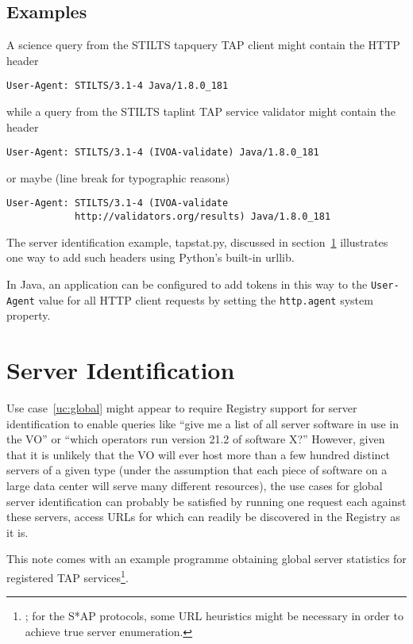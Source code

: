 \documentclass[11pt,a4paper]{ivoa}
\newcommand{\headername}[1]{{\tt #1}}
\begin{document}
\subsection{Examples}

A science query from the STILTS tapquery TAP client might contain the
HTTP header
\begin{verbatim}
User-Agent: STILTS/3.1-4 Java/1.8.0_181
\end{verbatim}
while a query from the STILTS taplint TAP service validator might
contain the header
\begin{verbatim}
User-Agent: STILTS/3.1-4 (IVOA-validate) Java/1.8.0_181
\end{verbatim}
or maybe (line break for typographic reasons)
\begin{verbatim}
User-Agent: STILTS/3.1-4 (IVOA-validate
            http://validators.org/results) Java/1.8.0_181
\end{verbatim}

The server identification example, tapstat.py, discussed in
section~\ref{sect:server} illustrates one way to add such headers using
Python's built-in urllib.

In Java, an application can be configured to add tokens in this way
to the \headername{User-Agent} value for all HTTP client requests
by setting the {\tt http.agent} system property.


\section{Server Identification}
\label{sect:server}

Use case~\ref{uc:global} might appear to require Registry support for
server identification to enable queries like ``give me a list of all
server software in use in the VO'' or ``which operators run version 21.2
of software X?''  However, given that it is unlikely that the VO will
ever host more than a few hundred distinct servers of a given type
(under the assumption that each piece of software on a large data center
will serve many different resources), the use cases for global server
identification can probably be satisfied by running one request each
against these servers, access URLs for which can readily be discovered
in the Registry as it is.  

This note comes with an example programme obtaining global server
statistics for registered TAP
services\footnote{; for the S*AP protocols,
some URL heuristics might be necessary in order to achieve true server
enumeration.}.
\end{document}
